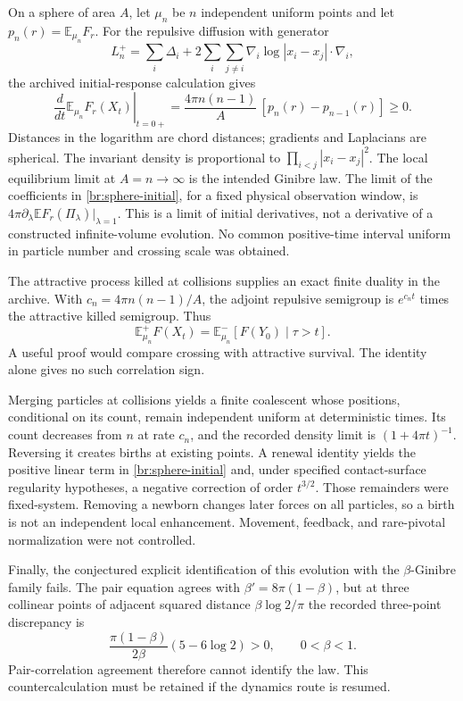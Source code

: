 \documentclass[11pt,a4paper]{article}
\theoremstyle{definition}
\theoremstyle{remark}
\numberwithin{equation}{section}
\begin{document}
On a sphere of area $A$, let $\mu_n$ be $n$ independent uniform points
and let $p_n(r)=\mathbb E_{\mu_n}F_r$.  For the repulsive diffusion with
generator
\[
 L_n^+=\sum_i\Delta_i+
 2\sum_i\sum_{j\ne i}
 \nabla_i\log|x_i-x_j|\cdot\nabla_i,
\]
the archived initial-response calculation gives
\begin{equation}
 \left.\frac{d}{dt}\mathbb E_{\mu_n}F_r(X_t)\right|_{t=0+}
 =\frac{4\pi n(n-1)}{A}\,[p_n(r)-p_{n-1}(r)]\geq0.
 \label{br:sphere-initial}
\end{equation}
Distances in the logarithm are chord distances; gradients and Laplacians
are spherical.  The invariant density is proportional to
$\prod_{i<j}|x_i-x_j|^2$.  The local equilibrium limit at $A=n\to\infty$
is the intended Ginibre law.  The limit of the coefficients in
\eqref{br:sphere-initial}, for a fixed physical observation window, is
$4\pi\partial_\lambda\mathbb EF_r(\Pi_\lambda)|_{\lambda=1}$.
This is a limit of initial derivatives, not a derivative of a constructed
infinite-volume evolution.  No common positive-time interval uniform in
particle number and crossing scale was obtained.

The attractive process killed at collisions supplies an exact finite
duality in the archive.  With $c_n=4\pi n(n-1)/A$, the adjoint repulsive
semigroup is $e^{c_nt}$ times the attractive killed semigroup.  Thus
\[
 \mathbb E^+_{\mu_n}F(X_t)
 =\mathbb E^-_{\mu_n}[F(Y_0)\mid\tau>t].
\]
A useful proof would compare crossing with attractive survival.  The
identity alone gives no such correlation sign.

Merging particles at collisions yields a finite coalescent whose
positions, conditional on its count, remain independent uniform at
deterministic times.  Its count decreases from $n$ at rate $c_n$, and the
recorded density limit is $(1+4\pi t)^{-1}$.  Reversing it creates births
at existing points.  A renewal identity yields the positive linear term
in \eqref{br:sphere-initial} and, under specified contact-surface
regularity hypotheses, a negative correction of order $t^{3/2}$.
Those remainders were fixed-system.  Removing a newborn changes later
forces on all particles, so a birth is not an independent local
enhancement.  Movement, feedback, and rare-pivotal normalization were
not controlled.

Finally, the conjectured explicit identification of this evolution with
the $\beta$-Ginibre family fails.  The pair equation agrees with
$\beta'=8\pi(1-\beta)$, but at three collinear points of adjacent squared
distance $\beta\log2/\pi$ the recorded three-point discrepancy is
\[
 \frac{\pi(1-\beta)}{2\beta}(5-6\log2)>0,
 \qquad0<\beta<1.
\]
Pair-correlation agreement therefore cannot identify the law.  This
countercalculation must be retained if the dynamics route is resumed.
\end{document}
